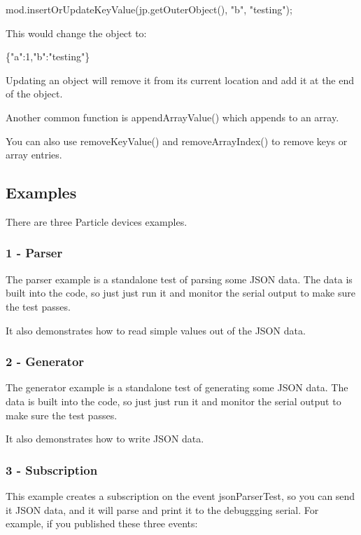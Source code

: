 \begin{DoxyCode}
mod.insertOrUpdateKeyValue(jp.getOuterObject(), "b", "testing");
\end{DoxyCode}


This would change the object to\+:


\begin{DoxyCode}
\{"a":1,"b":"testing"\}
\end{DoxyCode}


Updating an object will remove it from its current location and add it at the end of the object.

Another common function is {\ttfamily append\+Array\+Value()} which appends to an array.

You can also use {\ttfamily remove\+Key\+Value()} and {\ttfamily remove\+Array\+Index()} to remove keys or array entries.

\subsection*{Examples}

There are three Particle devices examples.

\subsubsection*{1 -\/ Parser}

The parser example is a standalone test of parsing some J\+S\+ON data. The data is built into the code, so just just run it and monitor the serial output to make sure the test passes.

It also demonstrates how to read simple values out of the J\+S\+ON data.

\subsubsection*{2 -\/ Generator}

The generator example is a standalone test of generating some J\+S\+ON data. The data is built into the code, so just just run it and monitor the serial output to make sure the test passes.

It also demonstrates how to write J\+S\+ON data.

\subsubsection*{3 -\/ Subscription}

This example creates a subscription on the event json\+Parser\+Test, so you can send it J\+S\+ON data, and it will parse and print it to the debuggging serial. For example, if you published these three events\+:


